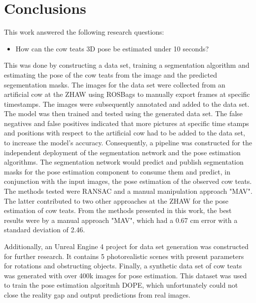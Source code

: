 \section{Conclusions}\label{sec:conclusions}
    This work answered the following research questions:
    \begin{itemize}
        \item How can the cow teats 3D pose be estimated under 10 seconds?
    \end{itemize}
    This was done by constructing a data set, training a segmentation algorithm and estimating the pose of the cow teats from the image and the predicted segementation masks. The images for the data set were collected from an artificial cow at the ZHAW using ROSBags to manually export frames at specific timestamps. The images were subsequently annotated and added to the data set. The model was then trained and tested using the generated data set. The false negatives and false positives indicated that more pictures at specific time stamps and positions with respect to the artificial cow had to be added to the data set, to increase the model's accuracy. Consequently, a pipeline was constructed for the independent deployment of the segmentation network and the pose estimation algorithms. The segmentation network would predict and publish segmentation masks for the pose estimation component to consume them and predict, in conjunction with the input images, the pose estimation of the observed cow teats. The methods tested were RANSAC and a manual manipulation approach "MAV". The latter contributed to two other approaches at the ZHAW for the pose estimation of cow teats. From the methods presented in this work, the best results were by a manual approach "MAV", which had a 0.67 cm error with a standard deviation of 2.46. 
    
    Additionally, an Unreal Engine 4 project for data set generation was constructed for further research. It contains 5 photorealistic scenes with present parameters for rotations and obstructing objects. Finally, a synthetic data set of cow teats was generated with over 400k images for pose estimation. This dataset was used to train the pose estimation algoritmh DOPE, which unfortunately could not close the reality gap and output predictions from real images.

